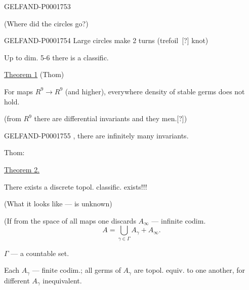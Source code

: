 \begin{GelfandAdjacentEvidence}{GELFAND-P000175}{3}
\end{GelfandAdjacentEvidence}

(Where did the circles go?)

\begin{GelfandAdjacentEvidence}{GELFAND-P000175}{4}
Large circles make 2 turns (trefoil\, [?] knot)
\end{GelfandAdjacentEvidence}


Up to dim. 5-6 there is a classific.

\underline{Theorem 1} (Thom)

For maps $R^9\to R^9$ (and higher), everywhere density of stable germs does not hold.

(from $R^9$ there are differential invariants and they men.[?])

\begin{GelfandAdjacentEvidence}{GELFAND-P000175}{5}
, there are infinitely many invariants.
\end{GelfandAdjacentEvidence}

Thom:

\underline{Theorem 2.}

There exists a discrete topol. classific. exists!!!

(What it looks like — is unknown)

(If from the space of all maps one discards $A_\infty$ — infinite codim.
\begin{equation*}A=\bigcup_{\gamma\in\Gamma}A_\gamma+A_\infty.\end{equation*}

$\Gamma$ — a countable set.

Each $A_\gamma$ — finite codim.; all germs of $A_\gamma$ are topol. equiv. to one another, for different $A_\gamma$ inequivalent.


